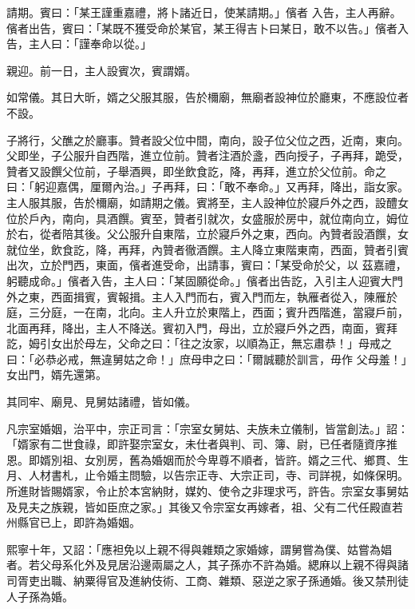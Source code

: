 \begin{pinyinscope}
 請期。賓曰：「某王謹重嘉禮，將卜諸近日，使某請期。」儐者
 入告，主人再辭。儐者出告，賓曰：「某既不獲受命於某官，某王得吉卜曰某日，敢不以告。」儐者入告，主人曰：「謹奉命以從。」



 親迎。前一日，主人設賓次，賓謂婿。



 如常儀。其日大昕，婿之父服其服，告於檷廟，無廟者設神位於廳東，不應設位者不設。



 子將行，父醮之於廳事。贊者設父位中間，南向，設子位父位之西，近南，東向。父即坐，子公服升自西階，進立位前。贊者注酒於盞，西向授子，子再拜，跪受，贊者又設饌父位前，子舉酒興，即坐飲食訖，降，再拜，進立於父位前。命之
 曰：「躬迎嘉偶，厘爾內治。」子再拜，曰：「敢不奉命。」又再拜，降出，詣女家。主人服其服，告於檷廟，如請期之儀。賓將至，主人設神位於寢戶外之西，設醴女位於戶內，南向，具酒饌。賓至，贊者引就次，女盛服於房中，就位南向立，姆位於右，從者陪其後。父公服升自東階，立於寢戶外之東，西向。內贊者設酒饌，女就位坐，飲食訖，降，再拜，內贊者徹酒饌。主人降立東階東南，西面，贊者引賓出次，立於門西，東面，儐者進受命，出請事，賓曰：「某受命於父，以
 茲嘉禮，躬聽成命。」儐者入告，主人曰：「某固願從命。」儐者出告訖，入引主人迎賓大門外之東，西面揖賓，賓報揖。主人入門而右，賓入門而左，執雁者從入，陳雁於庭，三分庭，一在南，北向。主人升立於東階上，西面；賓升西階進，當寢戶前，北面再拜，降出，主人不降送。賓初入門，母出，立於寢戶外之西，南面，賓拜訖，姆引女出於母左，父命之曰：「往之汝家，以順為正，無忘肅恭！」母戒之曰：「必恭必戒，無違舅姑之命！」庶母申之曰：「爾誠聽於訓言，毋作
 父母羞！」女出門，婿先還第。



 其同牢、廟見、見舅姑諸禮，皆如儀。



 凡宗室婚姻，治平中，宗正司言：「宗室女舅姑、夫族未立儀制，皆當創法。」詔：「婿家有二世食祿，即許娶宗室女，未仕者與判、司、簿、尉，已任者隨資序推恩。即婿別祖、女別房，舊為婚姻而於今卑尊不順者，皆許。婿之三代、鄉貫、生月、人材書札，止令婚主問驗，以告宗正寺、大宗正司，寺、司詳視，如條保明。所進財皆賜婿家，令止於本宮納財，媒妁、使令之非理求丐，許告。宗室女事舅姑
 及見夫之族親，皆如臣庶之家。」其後又令宗室女再嫁者，祖、父有二代任殿直若州縣官已上，即許為婚姻。



 熙寧十年，又詔：「應袒免以上親不得與雜類之家婚嫁，謂舅嘗為僕、姑嘗為娼者。若父母系化外及見居沿邊兩屬之人，其子孫亦不許為婚。緦麻以上親不得與諸司胥吏出職、納粟得官及進納伎術、工商、雜類、惡逆之家子孫通婚。後又禁刑徒人子孫為婚。




\end{pinyinscope}
